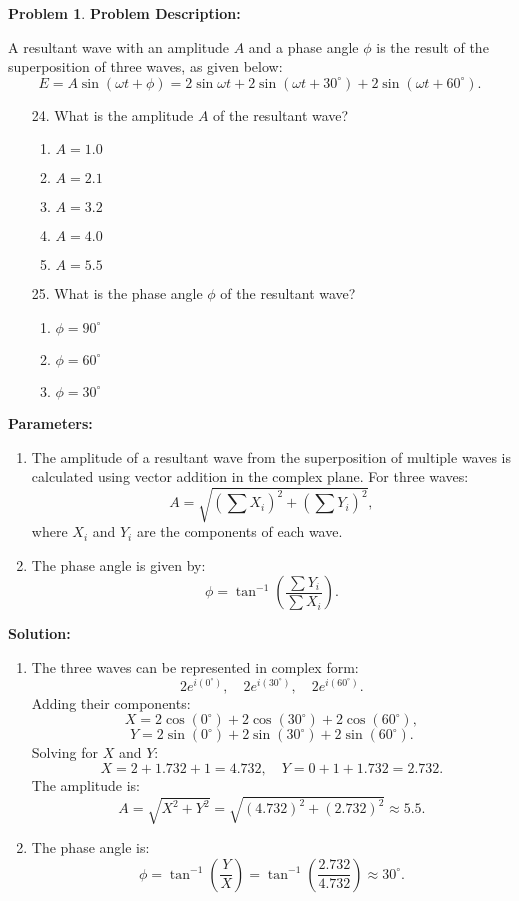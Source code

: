 \documentclass[12pt]{article}
\theoremstyle{definition} %
\newtheorem{problem}{Problem}
\theoremstyle{plain} %
\begin{document}
\begin{problem}
    \textbf{Problem Description:}

A resultant wave with an amplitude \(A\) and a phase angle \(\phi\) is the result of the superposition of three waves, as given below:
$$
E = A\sin(\omega t + \phi) = 2\sin\omega t + 2\sin(\omega t + 30^\circ) + 2\sin(\omega t + 60^\circ).
$$

\begin{enumerate}
    \item[24.] What is the amplitude \(A\) of the resultant wave?
    \begin{enumerate}
        \item \(A = 1.0\)
        \item \(A = 2.1\)
        \item \(A = 3.2\)
        \item \(A = 4.0\)
        \item \textbf{\(A = 5.5\)}
    \end{enumerate}

    \item[25.] What is the phase angle \(\phi\) of the resultant wave?
    \begin{enumerate}
        \item \(\phi = 90^\circ\)
        \item \(\phi = 60^\circ\)
        \item \textbf{\(\phi = 30^\circ\)}
    \end{enumerate}
\end{enumerate}

\textbf{Parameters:}
\begin{enumerate}
    \item The amplitude of a resultant wave from the superposition of multiple waves is calculated using vector addition in the complex plane. For three waves:
    $$
    A = \sqrt{\left(\sum X_i\right)^2 + \left(\sum Y_i\right)^2},
    $$
    where \(X_i\) and \(Y_i\) are the components of each wave.
    \item The phase angle is given by:
    $$
    \phi = \tan^{-1}\left(\frac{\sum Y_i}{\sum X_i}\right).
    $$
\end{enumerate}

\textbf{Solution:}
\begin{enumerate}
    \item The three waves can be represented in complex form:
    $$
    2e^{i(0^\circ)}, \quad 2e^{i(30^\circ)}, \quad 2e^{i(60^\circ)}.
    $$
    Adding their components:
    $$
    X = 2\cos(0^\circ) + 2\cos(30^\circ) + 2\cos(60^\circ),
    $$
    $$
    Y = 2\sin(0^\circ) + 2\sin(30^\circ) + 2\sin(60^\circ).
    $$
    Solving for \(X\) and \(Y\):
    $$
    X = 2 + 1.732 + 1 = 4.732, \quad Y = 0 + 1 + 1.732 = 2.732.
    $$
    The amplitude is:
    $$
    A = \sqrt{X^2 + Y^2} = \sqrt{(4.732)^2 + (2.732)^2} \approx 5.5.
    $$
    \item The phase angle is:
    $$
    \phi = \tan^{-1}\left(\frac{Y}{X}\right) = \tan^{-1}\left(\frac{2.732}{4.732}\right) \approx 30^\circ.
    $$
\end{enumerate}


\end{problem}
\end{document}
